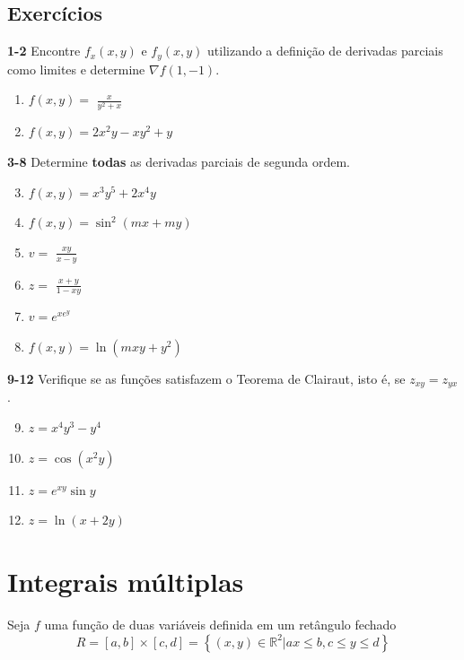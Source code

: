 \documentclass[a4paper, 12pt]{extreport}
\begin{document}
      \section{Exercícios}
      {\color{astral}\textbf{1-2}} Encontre $f_x(x,y)$ e $f_y(x,y)$ utilizando a definição de derivadas parciais como limites e \hspace*{5mm} determine $\nabla f(1,-1)$.
        \begin{multicols}{2}
          \begin{enumerate}
            \item $f(x,y) =$ {\large$\frac{x}{y^2+x}$}
            \item $f(x,y) = 2x^2y - xy^2 + y$
          \end{enumerate}
        \end{multicols}
        {\color{astral}\textbf{3-8}} Determine \textbf{todas} as derivadas parciais de segunda ordem.
        \begin{multicols}{2}
          \begin{enumerate}
            \setcounter{enumi}{2}
            \item $f(x,y) = x^3y^5 + 2x^4y$
            \item $f(x,y) = \sin^2{(mx + my)}$
            \item $v =$ {\large$\frac{xy}{x-y}$}
            \item $z =$ {\large$\frac{x+y}{1-xy}$}
            \item $v = e^{xe^y}$
            \item $f(x,y) = \ln{(mxy+y^2)}$
          \end{enumerate}
        \end{multicols}
        {\color{astral}\textbf{9-12}} Verifique se as funções satisfazem o Teorema de Clairaut, isto é, se $z_{xy} = z_{yx}$.
        \begin{multicols}{2}
          \begin{enumerate}
            \setcounter{enumi}{8}
            \item $z = x^4y^3 - y^4$
            \item $z = \cos{(x^2y)}$
            \item $z = e^{xy}\sin{y}$
            \item $z = \ln{(x+2y)}$
          \end{enumerate}
        \end{multicols}


  \chapter{Integrais múltiplas}
    Seja $f$ uma função de duas variáveis definida em um retângulo fechado
    $$ R = [a,b] \times [c,d] = \left\{(x,y) \in \mathbb{R}^2 | a x \leqslant b, c \leqslant y \leqslant d \right\} $$
\end{document}
